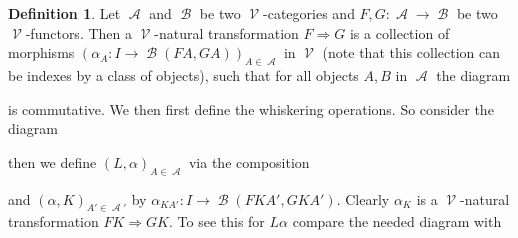 \documentclass[a4paper,11pt,oneside,openany]{scrbook}
\newcommand{\from}{\colon}
\DeclareMathOperator{\V}{\mathcal{V}}
\DeclareMathOperator{\A}{\mathcal{A}}
\DeclareMathOperator{\B}{\mathcal{B}}
\theoremstyle{definition}
\theoremstyle{definition}
\newtheorem{defn}[thm]{Definition} %
\begin{document}
\begin{defn}
   Let $\A$ and $\B$ be two $\V$-categories and $F,G \from \A \to \B$ be two $\V$-functors. Then a $\V$-natural transformation $F \Rightarrow G$ is a 
   collection of morphisms $(\alpha_{A} \from I \to \B(FA,GA))_{A \in \A}$ in $\V$ (note that this collection can be indexes by a class of objects), such that for 
   all objects $A,B$ in $\A$ the diagram 
      \begin{center}
      \end{center}
   is commutative. We then first define the whiskering operations. So consider the diagram 
      \begin{center}
      \end{center}
   then we define $(L, \alpha)_{A\in \A}$ via the composition 
      \begin{center}
      \end{center}
   and $(\alpha, K)_{A' \in \A'}$ by $\alpha_{KA'} \from I \to \B(FKA',GKA')$. Clearly $\alpha_{K}$ is a $\V$-natural transformation $FK \Rightarrow GK$. To see 
   this for $L\alpha$ compare the needed diagram with 
      \begin{center}
\end{center}
\end{defn}
\end{document}
